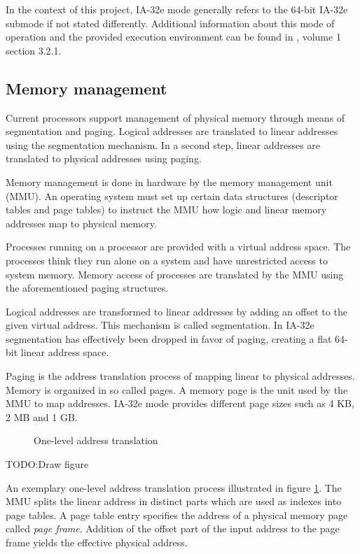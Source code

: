 In the context of this project, IA-32e mode generally refers to the 64-bit
IA-32e submode if not stated differently. Additional information about this mode
of operation and the provided execution environment can be found in
\cite{IntelSDM}, volume 1 section 3.2.1.

\subsection{Memory management}
Current processors support management of physical memory through means of
segmentation and paging. Logical addresses are translated to linear addresses
using the segmentation mechanism. In a second step, linear addresses are
translated to physical addresses using paging.

Memory management is done in hardware by the memory management unit
(MMU).  An operating system must set up certain data structures
(descriptor tables and page tables) to instruct the MMU how logic and linear
memory addresses map to physical memory.

Processes running on a processor are provided with a virtual address space. The
processes think they run alone on a system and have unrestricted access to
system memory. Memory access of processes are translated by the MMU using the
aforementioned paging structures.

Logical addresses are transformed to linear addresses by adding an offset to the
given virtual address. This mechanism is called segmentation. In IA-32e
segmentation has effectively been dropped in favor of paging, creating a flat
64-bit linear address space.

Paging is the address translation process of mapping linear to physical
addresses. Memory is organized in so called pages. A memory page is the unit
used by the MMU to map addresses. IA-32e mode provides different page sizes
such as 4 KB, 2 MB and 1 GB.

\begin{figure}[h]
	\centering
	
	\caption{One-level address translation}
	\label{fig:address-translation}
\end{figure}
TODO:Draw figure

An exemplary one-level address translation process illustrated in
figure \ref{fig:address-translation}. The MMU splits the linear address in
distinct parts which are used as indexes into page tables. A page table entry
specifies the address of a physical memory page called \emph{page frame}.
Addition of the offset part of the input address to the page frame yields the
effective physical address.

